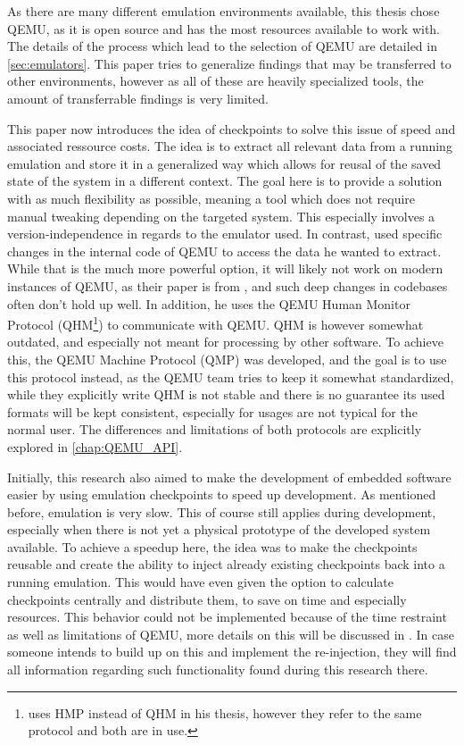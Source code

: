 As there are many different emulation environments available,
this thesis chose QEMU, as it is open source and has the most resources available to work with.
The details of the process which lead to the selection of QEMU are detailed in \autoref{sec:emulators}.
This paper tries to generalize findings that may be transferred to other environments,
however as all of these are heavily specialized tools,
the amount of transferrable findings is very limited.

This paper now introduces the idea of checkpoints to solve this issue of speed and associated ressource costs.
The idea is to extract all relevant data from a running emulation
and store it in a generalized way which allows for reusal of the saved state of the system in a different context.
The goal here is to provide a solution with as much flexibility as possible,
meaning a tool which does not require manual tweaking depending on the targeted system.
This especially involves a version-independence in regards to the emulator used.
In contrast,  used specific changes in the internal code of QEMU
to access the data he wanted to extract.
While that is the much more powerful option, it will likely not work on modern instances of QEMU,
as their paper is from \citeyear{kitcheckpoints}, and such deep changes in codebases often don't hold up well.
In addition, he uses the QEMU Human Monitor Protocol (QHM\footnote{ uses HMP instead of QHM in his thesis, however they refer to the same protocol and both are in use.}) to communicate with QEMU.
QHM is however somewhat outdated, and especially not meant for processing by other software.
To achieve this, the QEMU Machine Protocol (QMP) was developed, and the goal is to use this protocol instead,
as the QEMU team tries to keep it somewhat standardized,
while they explicitly write QHM is not stable and there is no guarantee its used formats will be kept consistent,
especially for usages are not typical for the normal user.
The differences and limitations of both protocols are explicitly explored in \autoref{chap:QEMU_API}.

Initially, this research also aimed to make the development of embedded software easier by using emulation checkpoints to speed up development.
As mentioned before, emulation is very slow.
This of course still applies during development, especially when there is not yet a physical prototype of the developed system available.
To achieve a speedup here, the idea was to make the checkpoints reusable
and create the ability to inject already existing checkpoints back into a running emulation.
This would have even given the option to calculate checkpoints centrally and distribute them,
to save on time and especially resources.
This behavior could not be implemented because of the time restraint as well as limitations of QEMU,
more details on this will be discussed in .
In case someone intends to build up on this and implement the re-injection,
they will find all information regarding such functionality found during this research there.